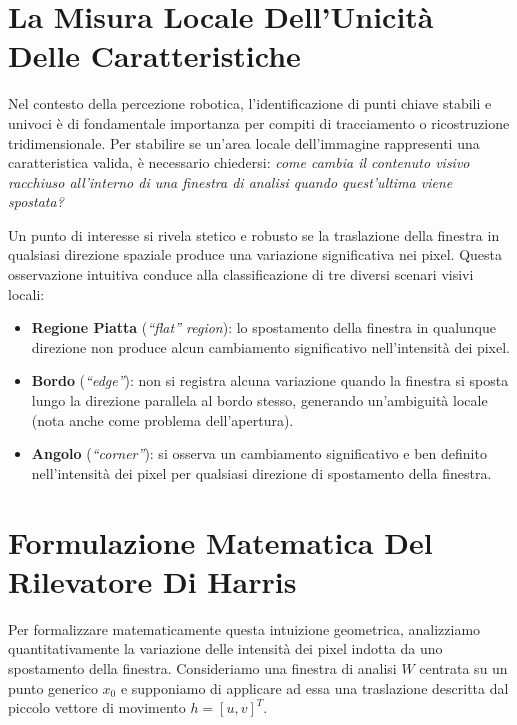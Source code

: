 ﻿\documentclass[11pt, a4paper]{article}
\begin{document}
\section{La Misura Locale Dell'Unicità Delle Caratteristiche}

Nel contesto della percezione robotica, l'identificazione di punti chiave stabili e univoci è di fondamentale importanza per compiti di tracciamento o ricostruzione tridimensionale. Per stabilire se un'area locale dell'immagine rappresenti una caratteristica valida, è necessario chiedersi: \emph{come cambia il contenuto visivo racchiuso all'interno di una finestra di analisi quando quest'ultima viene spostata?}


Un punto di interesse si rivela stetico e robusto se la traslazione della finestra in qualsiasi direzione spaziale produce una variazione significativa nei pixel. Questa osservazione intuitiva conduce alla classificazione di tre diversi scenari visivi locali:
\begin{itemize}[noitemsep]
    \item \textbf{Regione Piatta} (\emph{``flat'' region}): lo spostamento della finestra in qualunque direzione non produce alcun cambiamento significativo nell'intensità dei pixel.
    \item \textbf{Bordo} (\emph{``edge''}): non si registra alcuna variazione quando la finestra si sposta lungo la direzione parallela al bordo stesso, generando un'ambiguità locale (nota anche come problema dell'apertura).
    \item \textbf{Angolo} (\emph{``corner''}): si osserva un cambiamento significativo e ben definito nell'intensità dei pixel per qualsiasi direzione di spostamento della finestra.
\end{itemize}

\newpage

\section{Formulazione Matematica Del Rilevatore Di Harris}

Per formalizzare matematicamente questa intuizione geometrica, analizziamo quantitativamente la variazione delle intensità dei pixel indotta da uno spostamento della finestra. Consideriamo una finestra di analisi $W$ centrata su un punto generico $x_0$ e supponiamo di applicare ad essa una traslazione descritta dal piccolo vettore di movimento $h = [u, v]^T$.
\end{document}
